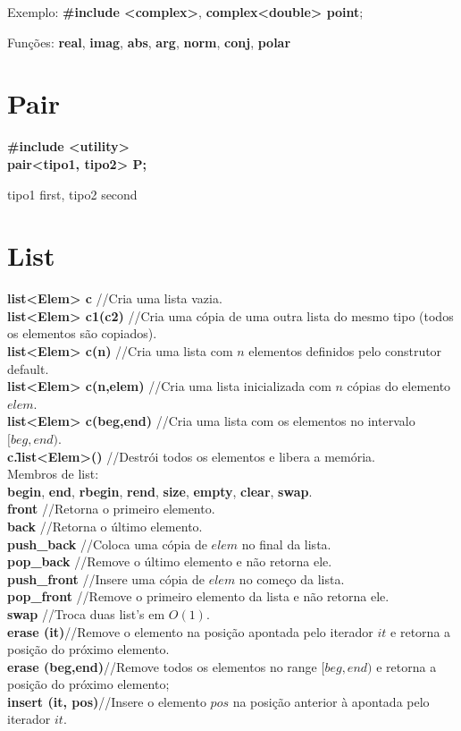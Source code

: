 \begin{multicols}{2}
Exemplo: \textbf{\#include <complex>}, \textbf{complex<double> point};

Funções: \textbf{real}, \textbf{imag}, \textbf{abs}, \textbf{arg}, \textbf{norm}, \textbf{conj}, \textbf{polar}

\section{Pair}

\textbf{\#include <utility>} \\
\textbf{pair<tipo1, tipo2> P;} 

tipo1 first, tipo2 second

\section{List}

\textbf{list<Elem> c} //Cria uma lista vazia.\\
\textbf{list<Elem> c1(c2)} //Cria uma cópia de uma outra lista do mesmo tipo (todos os elementos são copiados).\\
\textbf{list<Elem> c(n)} //Cria uma lista com $n$ elementos definidos pelo construtor default.\\
\textbf{list<Elem> c(n,elem)} //Cria uma lista inicializada com $n$ cópias do elemento $elem$.\\
\textbf{list<Elem> c(beg,end)} //Cria uma lista com os elementos no intervalo $[beg, end)$.\\
\textbf{c.\~list<Elem>()} //Destrói todos os elementos e libera a memória.\\

Membros de list:\\
\textbf{begin}, \textbf{end}, \textbf{rbegin}, \textbf{rend}, \textbf{size}, \textbf{empty}, \textbf{clear}, \textbf{swap}.\\
\textbf{front} //Retorna o primeiro elemento.\\
\textbf{back} //Retorna o último elemento.\\
\textbf{push\_back} //Coloca uma cópia de $elem$ no final da lista.\\
\textbf{pop\_back} //Remove o último elemento e não retorna ele.\\
\textbf{push\_front} //Insere uma cópia de $elem$ no começo da lista.\\
\textbf{pop\_front}	//Remove o primeiro elemento da lista e não retorna ele.\\
\textbf{swap} //Troca duas list's em $O(1)$.\\
\textbf{erase (it)}//Remove o elemento na posição apontada pelo iterador $it$ e retorna a posição do próximo elemento.\\
\textbf{erase (beg,end)}//Remove todos os elementos no range $[beg,end)$ e retorna a posição do próximo elemento;\\
\textbf{insert (it, pos)}//Insere o elemento $pos$ na posição anterior à apontada pelo iterador $it$.


\end{multicols}
